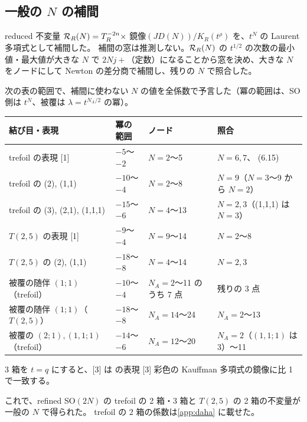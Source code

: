 \subsection{一般の $N$ の補間}
reduced 不変量 $\mathcal{R}_R(N) = T_R^{-2n}\times$ 鏡像$(JD(N))/K_R(t^\rho)$ を、$t^N$ の Laurent 多項式として補間した。
補間の窓は推測しない。$\mathcal{R}_R(N)$ の $t^{1/2}$ の次数の最小値・最大値が大きな $N$ で $2Nj + $（定数）になることから窓を決め、大きな $N$ をノードにして Newton の差分商で補間し、残りの $N$ で照合した。
\begin{compresult}\label{cr:interp}
次の表の範囲で、補間に使わない $N$ の値を全係数で予言した（冪の範囲は、SO 側は $t^N$、被覆は $\lambda = t^{N_A/2}$ の冪）。
\begin{center}
\footnotesize
\begin{tabular}{llll}
\toprule
結び目・表現 & 冪の範囲 & ノード & 照合 \\
\midrule
trefoil の表現 [1] & $-5$〜$-2$ & $N = 2$〜5 & $N = 6, 7$、\cite{AgSc12} (6.15) \\
trefoil の (2), (1,1) & $-10$〜$-4$ & $N = 2$〜8 & $N = 9$（$N = 3$〜9 から $N = 2$） \\
trefoil の (3), (2,1), (1,1,1) & $-15$〜$-6$ & $N = 4$〜13 & $N = 2, 3$（(1,1,1) は $N = 3$） \\
$T(2,5)$ の表現 [1] & $-9$〜$-4$ & $N = 9$〜14 & $N = 2$〜8 \\
$T(2,5)$ の (2), (1,1) & $-18$〜$-8$ & $N = 4$〜14 & $N = 2, 3$ \\
被覆の随伴 $(1;1)$（trefoil） & $-10$〜$-4$ & $N_A = 2$〜11 のうち 7 点 & 残りの 3 点 \\
被覆の随伴 $(1;1)$（$T(2,5)$） & $-18$〜$-8$ & $N_A = 14$〜24 & $N_A = 2$〜13 \\
被覆の $(2;1), (1,1;1)$（trefoil） & $-14$〜$-6$ & $N_A = 12$〜20 & $N_A = 2$（$(1,1;1)$ は 3）〜11 \\
\bottomrule
\end{tabular}
\end{center}
3 箱を $t = q$ にすると、[3] は \cite{NRZ13} の表現 [3] 彩色の Kauffman 多項式の鏡像に比 1 で一致する。
\end{compresult}
これで、refined SO$(2N)$ の trefoil の 2 箱・3 箱と $T(2,5)$ の 2 箱の不変量が一般の $N$ で得られた。
trefoil の 2 箱の係数は\ref{app:daha} に載せた。

